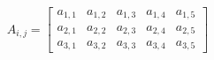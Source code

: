 \[
\boldsymbol{\mathit{A}}_{i,j} = 
\begin{bmatrix}
    a_{1,1} & a_{1,2} & a_{1,3} & a_{1,4} & a_{1,5} \\
    a_{2,1} & a_{2,2} & a_{2,3} & a_{2,4} & a_{2,5} \\
    a_{3,1} & a_{3,2} & a_{3,3} & a_{3,4} & a_{3,5}
\end{bmatrix}
\]

